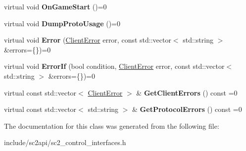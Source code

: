 \begin{DoxyCompactItemize}
virtual void {\bfseries On\+Game\+Start} ()=0
\item 
\mbox{\label{classsc2_1_1_control_interface_aac30977133be8ffe2a749a920149b5d3}} 
virtual void {\bfseries Dump\+Proto\+Usage} ()=0
\item 
\mbox{\label{classsc2_1_1_control_interface_ab3e7b964d0f7e90cc239e5997b09b5c4}} 
virtual void {\bfseries Error} (\hyperlink{sc2__client_8h_ac7d3e3694a208204e099f04c1e5eded0}{Client\+Error} error, const std\+::vector$<$ std\+::string $>$ \&errors=\{\})=0
\item 
\mbox{\label{classsc2_1_1_control_interface_a0f3a503c5e2ed951eed1774866a0280f}} 
virtual void {\bfseries Error\+If} (bool condition, \hyperlink{sc2__client_8h_ac7d3e3694a208204e099f04c1e5eded0}{Client\+Error} error, const std\+::vector$<$ std\+::string $>$ \&errors=\{\})=0
\item 
\mbox{\label{classsc2_1_1_control_interface_ac033fdc8fb4d4aa50a174b6d8870a143}} 
virtual const std\+::vector$<$ \hyperlink{sc2__client_8h_ac7d3e3694a208204e099f04c1e5eded0}{Client\+Error} $>$ \& {\bfseries Get\+Client\+Errors} () const =0
\item 
\mbox{\label{classsc2_1_1_control_interface_ac26497e85a0dc55ae82270f0f50d5f03}} 
virtual const std\+::vector$<$ std\+::string $>$ \& {\bfseries Get\+Protocol\+Errors} () const =0
\end{DoxyCompactItemize}


The documentation for this class was generated from the following file\+:\begin{DoxyCompactItemize}
\item 
include/sc2api/sc2\+\_\+control\+\_\+interfaces.\+h\end{DoxyCompactItemize}
